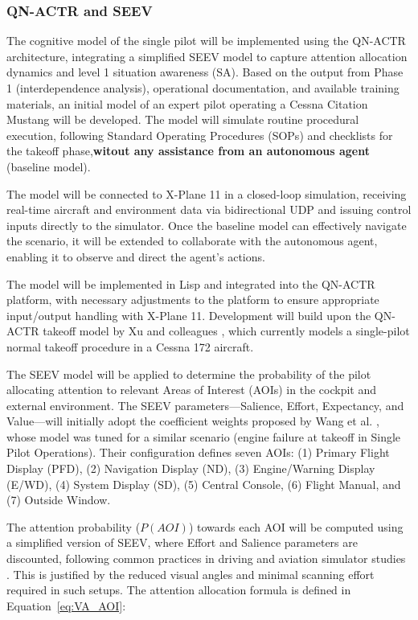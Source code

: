 \documentclass[12pt,a4paper]{article} %
\begin{document}
	\subsubsection{QN-ACTR and SEEV}
	The cognitive model of the single pilot will be implemented using the QN-ACTR architecture, integrating a simplified SEEV model to capture attention allocation dynamics and level 1 situation awareness (SA). Based on the output from Phase 1 (interdependence analysis), operational documentation, and available training materials, an initial model of an expert pilot operating a Cessna Citation Mustang will be developed. The model will simulate routine procedural execution, following Standard Operating Procedures (SOPs) and checklists for the takeoff phase,\textbf{witout any assistance from an autonomous agent} (baseline model).

	The model will be connected to X-Plane 11 in a closed-loop simulation, receiving real-time aircraft and environment data via bidirectional UDP and issuing control inputs directly to the simulator. Once the baseline model can effectively navigate the scenario, it will be extended to collaborate with the autonomous agent, enabling it to observe and direct the agent's actions.
	
	The model will be implemented in Lisp and integrated into the QN-ACTR platform, with necessary adjustments to the platform to ensure appropriate input/output handling with X-Plane 11. Development will build upon the QN-ACTR takeoff model by Xu and colleagues \parencite{xu_modeling_2021}, which currently models a single-pilot normal takeoff procedure in a Cessna 172 aircraft.
	
	The SEEV model will be applied to determine the probability of the pilot allocating attention to relevant Areas of Interest (AOIs) in the cockpit and external environment. The SEEV parameters—Salience, Effort, Expectancy, and Value—will initially adopt the coefficient weights proposed by Wang et al. \parencite{wang_real-time_2024}, whose model was tuned for a similar scenario (engine failure at takeoff in Single Pilot Operations). Their configuration defines seven AOIs: (1) Primary Flight Display (PFD), (2) Navigation Display (ND), (3) Engine/Warning Display (E/WD), (4) System Display (SD), (5) Central Console, (6) Flight Manual, and (7) Outside Window.
	
	The attention probability ($P(AOI)$) towards each AOI will be computed using a simplified version of SEEV, where Effort and Salience parameters are discounted, following common practices in driving and aviation simulator studies \parencite{rehman_phd_thesis}. This is justified by the reduced visual angles and minimal scanning effort required in such setups. The attention allocation formula is defined in Equation~\ref{eq:VA_AOI}: %
	
\end{document}

